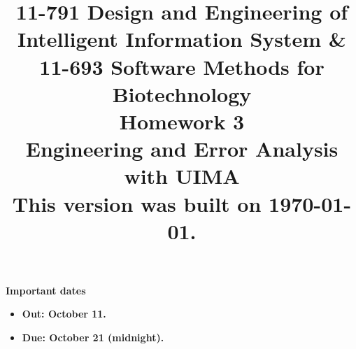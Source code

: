 \documentclass[oneside,11pt]{memoir}
\title{{\bfseries 11-791 Design and Engineering of Intelligent Information
System \& \\11-693 Software Methods for Biotechnology \\Homework 3}\\
\vspace{1em}
Engineering and Error Analysis with UIMA
\\
{\small This version was built on \today.}
}
\date{}
\begin{document}
\maketitle

\hspace{-0.1\textwidth}
\begin{minipage}{1.2\textwidth}
\vspace{-5em}
\textbf{Important dates}
\begin{itemize}

\item \textbf{Out: October 11.} 

\item \textbf{Due: October 21 (midnight).} 

\end{itemize}

\end{minipage}
\end{document}
